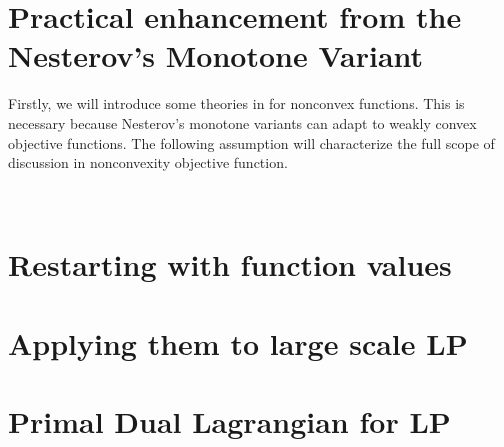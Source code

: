 \documentclass[12pt]{report}
\begin{document}
    \section{Practical enhancement from the Nesterov's Monotone Variant}
        Firstly, we will introduce some theories in for nonconvex functions. 
        This is necessary because Nesterov's monotone variants can adapt to weakly convex objective functions. 
        The following assumption will characterize the full scope of discussion in nonconvexity objective function. 
        \begin{definition}\;\label{def:nes-monotone-scheme}\\

            
        \end{definition}
    \section{Restarting with function values}
    \section{Applying them to large scale LP}
        
    
    
        


\section{Primal Dual Lagrangian for LP}
    






\end{document}
